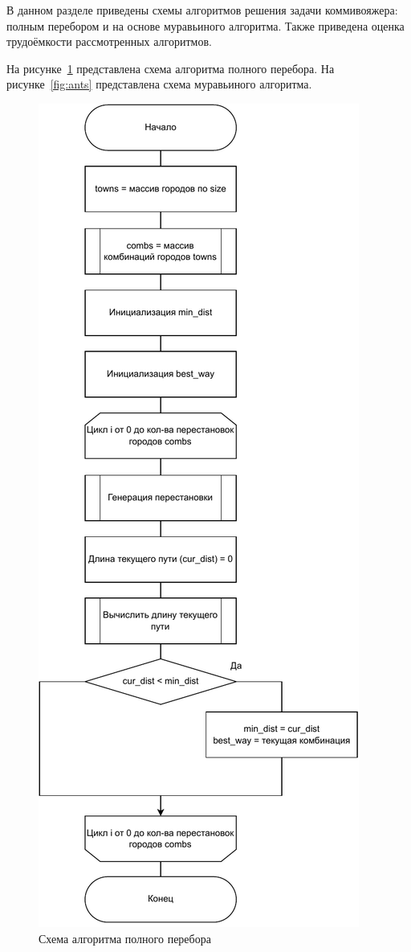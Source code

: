 \label{cha:design}

В данном разделе приведены схемы алгоритмов решения задачи коммивояжера: полным перебором и на основе муравьиного алгоритма. 
Также приведена оценка трудоёмкости рассмотренных алгоритмов.


На рисунке~\ref{fig:full-comb} представлена схема алгоритма полного перебора.
На рисунке~\ref{fig:ants} представлена схема муравьиного алгоритма.

\renewcommand{\thefigure}{\thesubsection.\arabic{figure}}
\begin{figure}[h]
	\centering
	\includegraphics[height=0.9\textheight]{svg/all_combs}
	\caption{Схема алгоритма полного перебора}
	\label{fig:full-comb}
\end{figure}

